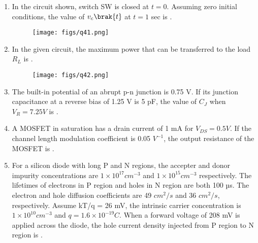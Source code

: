 \documentclass[a4paper, 11pt]{article}
\begin{document}
\begin{enumerate}
    \hfill{}

    \item In the circuit shown, switch SW is closed at $t=0$. Assuming zero initial conditions, the value of $v_{c}\brak{t}$  at $t=1$ sec is \underline{\hspace{2cm}}.
    \begin{figure}[H]
        \centering
        \texttt{[image: figs/q41.png]}
        \caption*{}
        \label{fig:q41}
    \end{figure}
    
    \hfill{}

    \item In the given circuit, the maximum power  that can be transferred to the load $R_{L}$ is \underline{\hspace{2cm}}.
    \begin{figure}[H]
        \centering
        \texttt{[image: figs/q42.png]}
        \caption*{}
        \label{fig:q42}
    \end{figure}
    
    \hfill{}

    \item The built-in potential of an abrupt p-n junction is 0.75 V. If its junction capacitance  at a reverse bias  of 1.25 V is 5 pF, the value of $C_{J}$  when $V_{R}=7.25 V$ is \underline{\hspace{2cm}}.
    
    \hfill{}

    \item A MOSFET in saturation has a drain current of 1 mA for $V_{DS}=0.5 V$. If the channel length modulation coefficient is 0.05 $V^{-1}$, the output resistance  of the MOSFET is \underline{\hspace{2cm}}.
    
    \hfill{}

    \item For a silicon diode with long P and N regions, the accepter and donor impurity concentrations are $1\times10^{17}cm^{-3}$ and $1\times10^{15}cm^{-3}$ respectively. The lifetimes of electrons in P region and holes in N region are both 100 µs. The electron and hole diffusion coefficients are 49 $cm^{2}/s$ and 36 $cm^{2}/s$, respectively. Assume kT/q = 26 mV, the intrinsic carrier concentration is $1\times10^{10}cm^{-3}$ and $q=1.6\times10^{-19}C$. When a forward voltage of 208 mV is applied across the diode, the hole current density  injected from P region to N region is \underline{\hspace{2cm}}.
    

\end{enumerate}
\end{document}
